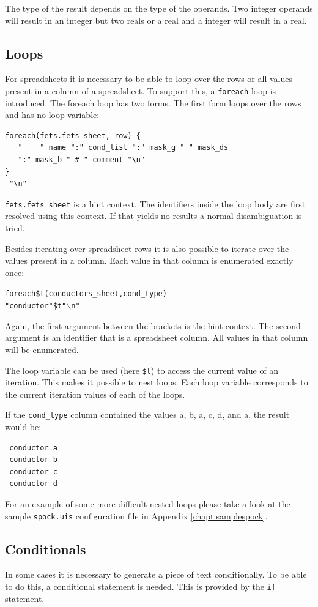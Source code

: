 The type of the result depends on the type of the operands. Two integer
operands will result in an integer but two reals or a real and a integer will
result in a real.

\subsection{Loops}
For spreadsheets it is necessary to be able to loop over the rows or all values
present in a column of a spreadsheet. To support this, a \verb=foreach= loop is
introduced. The foreach loop has two forms. The first form loops over the rows
and has no loop variable:

\begin{verbatim}
foreach(fets.fets_sheet, row) {
   "    " name ":" cond_list ":" mask_g " " mask_ds
   ":" mask_b " # " comment "\n"
}
 "\n"
\end{verbatim}
\verb=fets.fets_sheet= is a hint context. The identifiers inside the loop body
are first resolved using this context. If that yields no results a normal
disambiguation is tried.

\bigskip \noindent
Besides iterating over spreadsheet rows it is also possible to iterate over the
values present in a column. Each value in that column is enumerated exactly
once:

\begin{alltt}
foreach \$t (conductors_sheet, cond_type) {
    "conductor " \$t "\(\backslash\)n"
}
\end{alltt}

Again, the first argument between the brackets is the hint context. The second
argument is an identifier that is a spreadsheet column. All values in that
column will be enumerated.

The loop variable can be used (here \texttt{\$t}) to access the current value
of an iteration. This makes it possible to nest loops. Each loop variable
corresponds to the current iteration values of each of the loops.

If the \verb=cond_type= column contained the values a, b, a, c, d, and a, the
result would be:
\begin{verbatim}
 conductor a
 conductor b
 conductor c
 conductor d
\end{verbatim}

For an example of some more difficult nested loops please take a look at the
sample \verb=spock.uis= configuration file in Appendix \ref{chapt:samplespock}.

\subsection{Conditionals}
In some cases it is necessary to generate a piece of text conditionally. To be
able to do this, a conditional statement is needed. This is provided by the
\verb=if= statement.

